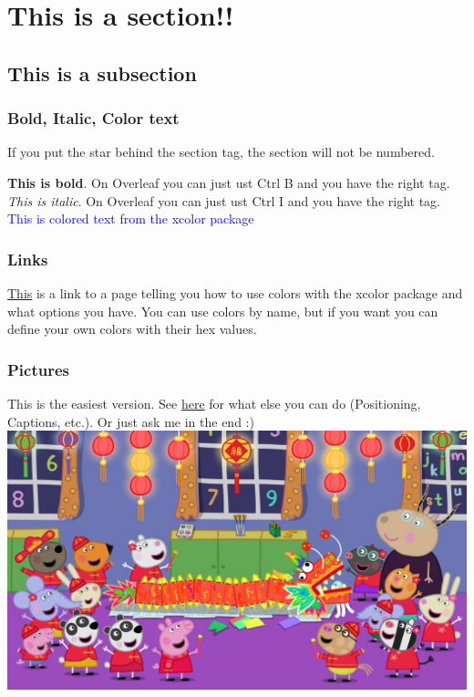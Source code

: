 \documentclass[../main.tex]{subfiles}
\begin{document}
\section{This is a section!!}
\subsection{This is a subsection}

\subsubsection*{Bold, Italic, Color text}

If you put the star behind the section tag, the section will not be numbered.

\textbf{This is bold}. On Overleaf you can just ust Ctrl B and you have the right tag.
\textit{This is italic}. On Overleaf you can just ust Ctrl I and you have the right tag.
\textcolor{blue}{This is colored text from the xcolor package}

\subsubsection*{Links}
 
\href{https://ftp.agdsn.de/pub/mirrors/latex/dante/macros/latex/contrib/xcolor/xcolor.pdf}{This} is a link to a page telling you how to use colors with the xcolor package and what options you have. You can use colors by name, but if you want you can define your own colors with their hex values.
 
\subsubsection*{Pictures}

This is the easiest version. See \href{https://www.overleaf.com/learn/latex/Inserting_Images}{here} for what else you can do (Positioning, Captions, etc.). Or just ask me in the end :) \\

\includegraphics[width=\textwidth]{images/peppaPig.jpg}
\end{document}
